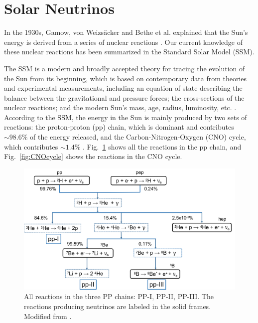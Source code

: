 \section{Solar Neutrinos}\label{sect:solarNu}

In the 1930s, Gamow, von Weizs{\"a}cker and Bethe et al. explained that the Sun's energy is derived from a series of nuclear reactions \cite{bethe1939energy}. Our current knowledge of these nuclear reactions has been summarized in the Standard Solar Model (SSM). 

The SSM is a modern and broadly accepted theory for tracing the evolution of the Sun from its beginning, which is based on contemporary data from theories and experimental measurements, including an equation of state describing the balance between the gravitational and pressure forces; the cross-sections of the nuclear reactions; and the modern Sun's mass, age, radius, luminosity, etc. \cite{haxton2013solar}. According to the SSM, the energy in the Sun is mainly produced by two sets of reactions: the proton-proton (pp) chain, which is dominant and contributes $\sim 98.6\%$ of the energy released, and the Carbon-Nitrogen-Oxygen (CNO) cycle, which contributes $\sim 1.4\%$ \cite{antonio2018state}. Fig.~\ref{fig:ppChain} shows all the reactions in the pp chain, and Fig.~\ref{fig:CNOcycle} shows the reactions in the CNO cycle. 

\begin{figure}[htbp]
	\centering	
	\includegraphics[width=14cm]{ppChain.png}
	\caption[All reactions in the three PP chains.]{All reactions in the three PP chains: PP-I, PP-II, PP-III. The reactions producing neutrinos are labeled in the solid frames. Modified from \cite{oberauer2020solar}.	\label{fig:ppChain}}
\end{figure}

